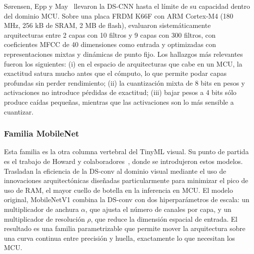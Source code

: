 \documentclass[a4paper,12pt,twoside,final]{book}
\begin{document}
Sørensen, Epp y May~\cite{sørensen2022journalonasm} llevaron la DS-CNN hasta el límite de su capacidad dentro del
dominio MCU. Sobre una placa FRDM K66F con ARM Cortex-M4 (180 MHz, 256 kB de SRAM, 2 MB de flash), evaluaron
sistemáticamente arquitecturas entre 2 capas con 10 filtros y 9 capas con 300 filtros, con coeficientes MFCC de 40
dimensiones como entrada y optimizadas con representaciones mixtas y dinámicas de punto fijo. Los hallazgos más
relevantes fueron los siguientes: (i) en el espacio de arquitecturas que cabe en un MCU, la exactitud satura mucho
antes que el cómputo, lo que permite podar capas profundas sin perder rendimiento; (ii) la cuantización mixta de 8 bits
en pesos y activaciones no introduce pérdidas de exactitud; (iii) bajar pesos a 4 bits sólo produce caídas pequeñas,
mientras que las activaciones son lo más sensible a cuantizar.

\newpage
\subsubsection{Familia MobileNet}
Esta familia es la otra columna vertebral del TinyML visual. Su punto de partida es el trabajo de Howard y
colaboradores~\cite{howard2017mobilenets}, donde se introdujeron estos modelos. Trasladan la eficiencia de la DS-conv
al dominio visual mediante el uso de innovaciones arquitectónicas diseñadas particularmente para minimizar el pico de
uso de RAM, el mayor cuello de botella en la inferencia en MCU. El modelo original, MobileNetV1 combina la DS-conv
con dos hiperparámetros de escala: un multiplicador de anchura $\alpha$, que ajusta el número de canales por capa, y
un multiplicador de resolución $\rho$, que reduce la dimensión espacial de entrada. El resultado es una familia
parametrizable que permite mover la arquitectura sobre una curva continua entre precisión y huella, exactamente lo
que necesitan los MCU.\\
\end{document}
